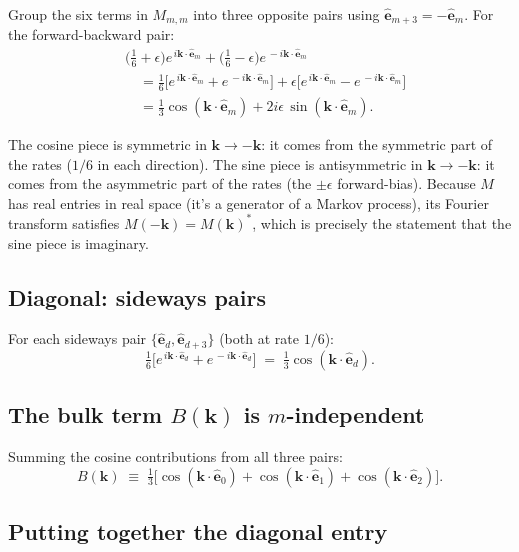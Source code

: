 \documentclass[11pt,a4paper]{article}
\newcommand{\nn}{\nonumber \\}
\newcommand{\vk}{\mathbf{k}}
\newcommand{\veps}[1]{\hat{\mathbf{e}}_{#1}}
\begin{document}
Group the six terms in $M_{m,m}$ into three opposite pairs using
$\veps{m+3} = -\veps{m}$. For the forward-backward pair:
\begin{align}\label{eq:fb_pair_step}
&\big(\tfrac{1}{6}+\epsilon\big) e^{\,i\vk\cdot\veps{m}} + \big(\tfrac{1}{6}-\epsilon\big) e^{\,-i\vk\cdot\veps{m}} \nn
&\quad = \tfrac{1}{6}\big[e^{\,i\vk\cdot\veps{m}} + e^{\,-i\vk\cdot\veps{m}}\big] + \epsilon\big[e^{\,i\vk\cdot\veps{m}} - e^{\,-i\vk\cdot\veps{m}}\big] \nn
&\quad = \tfrac{1}{3}\cos(\vk\cdot\veps{m}) + 2 i \epsilon\, \sin(\vk\cdot\veps{m}).
\end{align}

\begin{intuition}
The cosine piece is symmetric in $\vk \to -\vk$: it comes from the
symmetric part of the rates ($1/6$ in each direction). The sine piece is
antisymmetric in $\vk \to -\vk$: it comes from the asymmetric part of
the rates (the $\pm \epsilon$ forward-bias). Because $M$ has real
entries in real space (it's a generator of a Markov process), its
Fourier transform satisfies $M(-\vk) = M(\vk)^*$, which is precisely the
statement that the sine piece is imaginary.
\end{intuition}

\subsection{Diagonal: sideways pairs}\label{ssec:diag_side}

For each sideways pair $\{\veps{d}, \veps{d+3}\}$ (both at rate $1/6$):
\begin{equation}\label{eq:side_pair_step}
\tfrac{1}{6}\big[e^{\,i\vk\cdot\veps{d}} + e^{\,-i\vk\cdot\veps{d}}\big]
\;=\; \tfrac{1}{3}\cos(\vk\cdot\veps{d}).
\end{equation}

\subsection{The bulk term $B(\vk)$ is $m$-independent}\label{ssec:bulk_indep}

Summing the cosine contributions from all three pairs:
\begin{equation}\label{eq:bulk}
\boxed{\;\;
B(\vk) \;\equiv\; \tfrac{1}{3}\big[\cos(\vk\cdot\veps{0}) + \cos(\vk\cdot\veps{1}) + \cos(\vk\cdot\veps{2})\big].
\;\;}
\end{equation}

\subsection{Putting together the diagonal entry}\label{ssec:diag_total}
\end{document}
